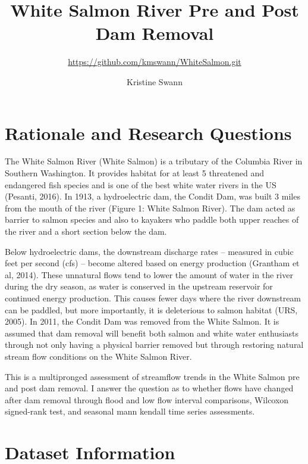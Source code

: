 \documentclass[
  12pt,
]{article}
\title{White Salmon River Pre and Post Dam Removal}
\subtitle{\url{https://github.com/kmswann/WhiteSalmon.git}}
\author{Kristine Swann}
\date{}
\begin{document}
\maketitle

\newpage
\tableofcontents 
\newpage
\listoftables 
\newpage
\listoffigures 
\newpage

\hypertarget{rationale-and-research-questions}{%
\section{Rationale and Research
Questions}\label{rationale-and-research-questions}}

The White Salmon River (White Salmon) is a tributary of the Columbia
River in Southern Washington. It provides habitat for at least 5
threatened and endangered fish species and is one of the best white
water rivers in the US (Pesanti, 2016). In 1913, a hydroelectric dam,
the Condit Dam, was built 3 miles from the mouth of the river (Figure 1:
White Salmon River). The dam acted as barrier to salmon species and also
to kayakers who paddle both upper reaches of the river and a short
section below the dam.

Below hydroelectric dams, the downstream discharge rates -- measured in
cubic feet per second (cfs) -- become altered based on energy production
(Grantham et al, 2014). These unnatural flows tend to lower the amount
of water in the river during the dry season, as water is conserved in
the upstream reservoir for continued energy production. This causes
fewer days where the river downstream can be paddled, but more
importantly, it is deleterious to salmon habitat (URS, 2005). In 2011,
the Condit Dam was removed from the White Salmon. It is assumed that dam
removal will benefit both salmon and white water enthusiasts through not
only having a physical barrier removed but through restoring natural
stream flow conditions on the White Salmon River.

This is a multipronged assessment of streamflow trends in the White
Salmon pre and post dam removal. I answer the question as to whether
flows have changed after dam removal through flood and low flow interval
comparisons, Wilcoxon signed-rank test, and seasonal mann kendall time
series assessments.

\newpage

\hypertarget{dataset-information}{%
\section{Dataset Information}\label{dataset-information}}
\end{document}
